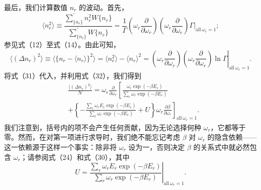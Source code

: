 最后，我们计算数值 \(n_{r}\) 的波动。首先，
\begin{equation}\tag{3.2.35}\label{eq:3.2.35}
\langle n _ { r } ^{2} \rangle \equiv \frac { \sum _ { \{ n _ { r } \} } ^{\prime} n _ { r } ^{2} W \{ n _ { r } \} } { \sum _ { \{ n _ { r } \} } ^{\prime} W \{ n _ { r } \} } = \frac { 1 } { \Gamma } \left( \omega _ { r } \frac { \partial } { \partial \omega _ { r } } \right) \left( \omega _ { r } \frac { \partial } { \partial \omega _ { r } } \right) \Gamma \Big | _ { \mathrm { a l l } \ \omega _ { r } = 1 } ;
\end{equation}
参见式（12）至式（14）。由此可知，
\begin{equation}\tag{3.2.36}\label{eq:3.2.36}
\langle ( \Delta n _ { r } ) ^{2} \rangle \equiv \langle \{ n _ { r } - \langle n _ { r } \rangle \} ^{2} \rangle = \langle n _ { r } ^{2} \rangle - \langle n _ { r } \rangle ^{2} = \left. \left( \omega _ { r } \frac { \partial } { \partial \omega _ { r } } \right) \left( \omega _ { r } \frac { \partial } { \partial \omega _ { r } } \right) \ln \Gamma \right| _ { \mathrm { a l l } \ \omega _ { r } = 1 } .
\end{equation}
将式（31）代入，并利用式（32），我们得到
\begin{equation}\tag{3.2.37}\label{eq:3.2.37}
\begin{array}{rl} & { \frac { \langle ( \Delta n _ { r } ) ^{2} \rangle } { \mathcal { N } } = \omega _ { r } \frac { \partial } { \partial \omega _ { r } } \left[ \frac { \omega _ { r } \exp ( - \beta E _ { r } ) } { \sum _ { r } \omega _ { r } \exp ( - \beta E _ { r } ) } \right. } \\& { \left. + \left\{ - \frac { \sum _ { r } \omega _ { r } E _ { r } \exp ( - \beta E _ { r } ) } { \sum _ { r } \omega _ { r } \exp ( - \beta E _ { r } ) } + U \right\} \omega _ { r } \frac { \partial \beta } { \partial \omega _ { r } } \right] _ { \mathrm { a l l } \ \omega _ { r } = 1 } . } \end{array}
\end{equation}
我们注意到，括号内的项不会产生任何贡献，因为无论选择何种 \(\omega_{r}\)，它都等于零。然而，在对第一项进行求导时，我们绝不能忘记考虑 \(\beta\) 对 \(\omega_{r}\) 的隐含依赖——这一依赖源于这样一个事实：除非将 \(\omega_{r}\) 设为一，否则决定 \(\beta\) 的关系式中就必然包含 \(\omega_{r}\)；请参阅式（24）和式（30），其中
\begin{equation}\tag{3.2.38}\label{eq:3.2.38}
U = \left. \frac { \sum _ { r } \omega _ { r } E _ { r } \exp ( - \beta E _ { r } ) } { \sum _ { r } \omega _ { r } \exp ( - \beta E _ { r } ) } \right| _ { \mathrm { a l l } \ \omega _ { r } = 1 } .
\end{equation}
